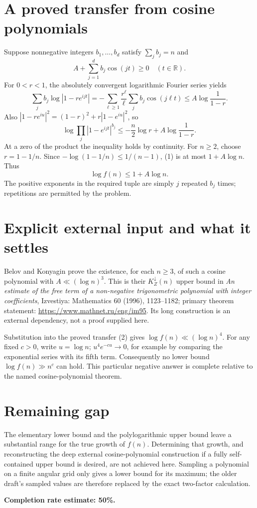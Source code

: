 \documentclass[11pt]{article}
\begin{document}
\section*{A proved transfer from cosine polynomials}
Suppose nonnegative integers $b_1,\ldots,b_d$ satisfy $\sum_j b_j=n$ and
\[
 A+\sum_{j=1}^d b_j\cos(jt)\ge0\quad(t\in\mathbb R).
\]
For $0<r<1$, the absolutely convergent logarithmic Fourier series yields
\[
 \sum_j b_j\log|1-r e^{ijt}|
 =-\sum_{\ell\ge1}\frac{r^\ell}{\ell}\sum_j b_j\cos(j\ell t)
 \le A\log\frac1{1-r}.
\]
Also $|1-r e^{iu}|^2=(1-r)^2+r|1-e^{iu}|^2$, so
\[
 \log\prod_j|1-e^{ijt}|^{b_j}
 \le-\frac n2\log r+A\log\frac1{1-r}. \tag{1}
\]
At a zero of the product the inequality holds by continuity. For $n\ge2$, choose $r=1-1/n$. Since $-\log(1-1/n)\le1/(n-1)$, (1) is at most $1+A\log n$. Thus
\[
 \log f(n)\le1+A\log n. \tag{2}
\]
The positive exponents in the required tuple are simply $j$ repeated $b_j$ times; repetitions are permitted by the problem.

\section*{Explicit external input and what it settles}
Belov and Konyagin prove the existence, for each $n\ge3$, of such a cosine polynomial with $A\ll(\log n)^3$. This is their $K_Z^{\downarrow}(n)$ upper bound in \emph{An estimate of the free term of a non-negative trigonometric polynomial with integer coefficients}, Izvestiya: Mathematics 60 (1996), 1123--1182; primary theorem statement: \url{https://www.mathnet.ru/eng/im95}. Its long construction is an external dependency, not a proof supplied here.

Substitution into the proved transfer (2) gives $\log f(n)\ll(\log n)^4$. For any fixed $c>0$, write $u=\log n$; $u^4e^{-cu}\to0$, for example by comparing the exponential series with its fifth term. Consequently no lower bound $\log f(n)\gg n^c$ can hold. This particular negative answer is complete relative to the named cosine-polynomial theorem.

\section*{Remaining gap}
The elementary lower bound and the polylogarithmic upper bound leave a substantial range for the true growth of $f(n)$. Determining that growth, and reconstructing the deep external cosine-polynomial construction if a fully self-contained upper bound is desired, are not achieved here. Sampling a polynomial on a finite angular grid only gives a lower bound for its maximum; the older draft's sampled values are therefore replaced by the exact two-factor calculation.

\textbf{Completion rate estimate: 50\%.}
\end{document}
